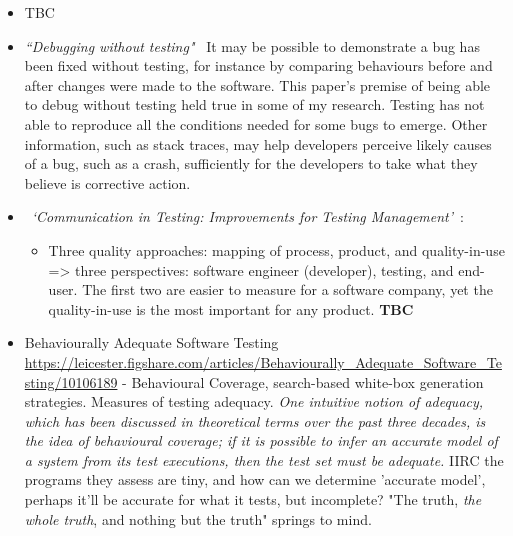 \begin{itemize}
    \item TBC
    \item \emph{``Debugging without testing"}~\cite{ghardallou2016debugging_without_testing} It may be possible to demonstrate a bug has been fixed without testing, for instance by comparing behaviours before and after changes were made to the software. This paper's premise of being able to debug without testing held true in some of my research. Testing has not able to reproduce all the conditions needed for some bugs to emerge. Other information, such as stack traces, may help developers perceive likely causes of a bug, such as a crash, sufficiently for the developers to take what they believe is corrective action.  
    
    \item ~\emph{`Communication in Testing: Improvements for Testing Management'}~\citep{paakkonen2009_communication_in_testing}: 
    \begin{itemize}
        \item Three quality approaches: mapping of process, product, and quality-in-use => three perspectives: software engineer (developer), testing, and end-user. The first two are easier to measure for a software company, yet the quality-in-use is the most important for any product. \textbf{TBC}
    \end{itemize}
    
    \item Behaviourally Adequate Software Testing \url{https://leicester.figshare.com/articles/Behaviourally_Adequate_Software_Testing/10106189} - Behavioural Coverage, search-based white-box generation strategies. Measures of testing adequacy. \emph{One intuitive notion of adequacy, which has been discussed in theoretical terms over the past three decades, is the idea of behavioural coverage; if it is possible to infer an accurate model of a system from its test executions, then the test set must be adequate.} IIRC the programs they assess are tiny, and how can we determine 'accurate model', perhaps it'll be accurate for what it tests, but incomplete? "The truth, \emph{the whole truth}, and nothing but the truth" springs to mind. %

\end{itemize}


